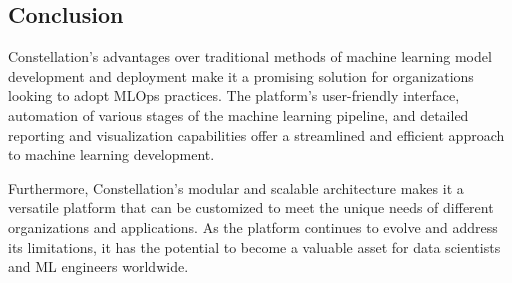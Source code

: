 \documentclass[12pt,a4paper]{report}     %
\begin{document}
\begin{normalsize}
{{{{%
\newpage 
\chapter{}
{\setlength{\baselineskip}{1.1\baselineskip}
\section{Conclusion}

Constellation's advantages over traditional methods of machine learning model development and deployment make it a promising solution for organizations looking to adopt MLOps practices. The platform's user-friendly interface, automation of various stages of the machine learning pipeline, and detailed reporting and visualization capabilities offer a streamlined and efficient approach to machine learning development.
\par
Furthermore, Constellation's modular and scalable architecture makes it a versatile platform that can be customized to meet the unique needs of different organizations and applications. As the platform continues to evolve and address its limitations, it has the potential to become a valuable asset for data scientists and ML engineers worldwide.

}}}}}
\end{normalsize}
\end{document}
